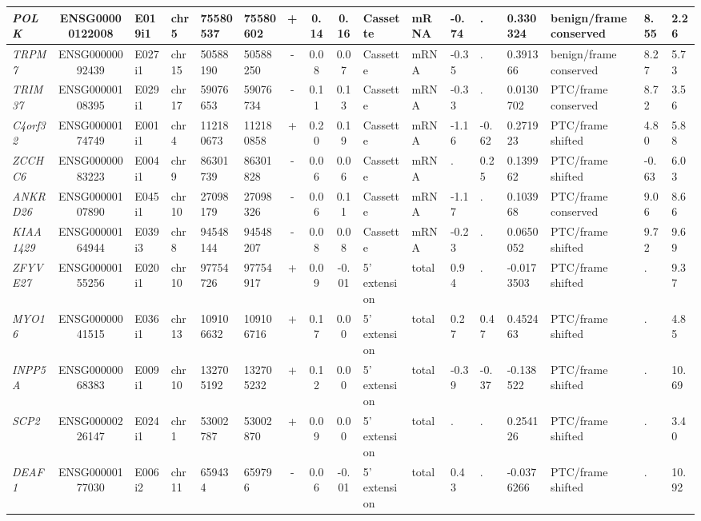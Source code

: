 \begin{landscape}
\begin{table}
{\begin{tabular}{|l|c|l|l|l|l|c|c|c|l|l|l|l|l|l|l|l|}
		\textit{POLK} & ENSG00000122008 & E019i1 & chr5  & 75580537 & 75580602 & +     & 0.14  & 0.16  & Cassette & mRNA  & -0.74 & . & 0.330324 & benign/frame conserved & 8.55  &  2.26 \\ \hline
		\textit{TRPM7} & ENSG00000092439 & E027i1 & chr15 & 50588190 & 50588250 & -     & 0.08  & 0.07  & Cassette & mRNA  & -0.35 & . & 0.391366 & benign/frame conserved & 8.27  &  5.73 \\ \hline
		\textit{TRIM37} & ENSG00000108395 & E029i1 & chr17 & 59076653 & 59076734 & -     & 0.11  & 0.13  & Cassette & mRNA  & -0.33 & . & 0.0130702 & PTC/frame conserved & 8.72  &  3.56 \\ \hline
		\textit{C4orf32} & ENSG00000174749 & E001i1 & chr4  & 112180673 & 112180858 & +     & 0.20  & 0.19  & Cassette & mRNA  & -1.16 & -0.62 & 0.271923 & PTC/frame shifted & 4.80  &  5.88 \\ \hline
		\textit{ZCCHC6} & ENSG00000083223 & E004i1 & chr9  & 86301739 & 86301828 & -     & 0.06  & 0.06  & Cassette & mRNA  & . & 0.25  & 0.139962 & PTC/frame shifted & -0.63 &  6.03 \\ \hline
		\textit{ANKRD26} & ENSG00000107890 & E045i1 & chr10 & 27098179 & 27098326 & -     & 0.06  & 0.11  & Cassette & mRNA  & -1.17 & . & 0.103968 & PTC/frame conserved & 9.06  &  8.66 \\ \hline
		\textit{KIAA1429} & ENSG00000164944 & E039i3 & chr8  & 94548144 & 94548207 & -     & 0.08  & 0.08  & Cassette & mRNA  & -0.23 & . & 0.0650052 & PTC/frame shifted & 9.72  &  9.69 \\ \hline
		\textit{ZFYVE27} & ENSG00000155256 & E020i1 & chr10 & 97754726 & 97754917 & +     & 0.09  & -0.01 & 5' extension & total & 0.94  & . & -0.0173503 & PTC/frame shifted & . &  9.37 \\ \hline
		\textit{MYO16} & ENSG00000041515 & E036i1 & chr13 & 109106632 & 109106716 & +     & 0.17  & 0.00  & 5' extension & total & 0.27  & 0.47  & 0.452463 & PTC/frame shifted & . &  4.85 \\ \hline
		\textit{INPP5A} & ENSG00000068383 & E009i1 & chr10 & 132705192 & 132705232 & +     & 0.12  & 0.00  & 5' extension & total & -0.39 & -0.37 & -0.138522 & PTC/frame shifted & . &  10.69 \\ \hline
		\textit{SCP2} & ENSG00000226147 & E024i1 & chr1  & 53002787 & 53002870 & +     & 0.09  & 0.00  & 5' extension & total & . & . & 0.254126 & PTC/frame shifted & . &  3.40 \\ \hline
		\textit{DEAF1} & ENSG00000177030 & E006i2 & chr11 & 659434 & 659796 & -     & 0.06  & -0.01 & 5' extension & total & 0.43  & . & -0.0376266 & PTC/frame shifted & . &  10.92 \\ \hline

\end{tabular}}
\end{table}
\end{landscape}
